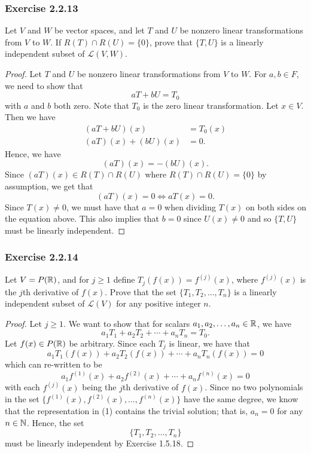 \subsubsection{Exercise 2.2.13} Let \( V  \) and \( W  \) be vector spaces, and let \( T  \) and \( U  \) be nonzero linear transformations from \( V  \) to \( W  \). If \( R(T) \cap R(U) = \{ 0  \}   \), prove that \( \{ T, U  \}   \) is a linearly independent subset of \( \mathcal{L}(V, W ) \).
\begin{proof}
Let \( T \) and \( U  \) be nonzero linear transformations from \( V  \) to \( W  \). For \( a,b \in F  \), we need to show that 
\[  aT + bU = {T}_{0} \] with \( a  \) and \( b  \) both zero. Note that \( {T}_{0} \) is the zero linear transformation. Let \( x \in V  \). Then we have
\begin{align*}
    (aT + bU)(x) &= {T}_{0}(x)  \\
    (aT)(x) + (bU)(x) &= 0. 
\end{align*}
Hence, we have
\[  (aT)(x) = -(bU)(x).  \]
Since \( (aT)(x) \in R(T) \cap R(U) \) where \( R(T) \cap R(U) = \{ 0  \}   \) by assumption, we get that
\[  (aT)(x) = 0 \iff aT(x) = 0. \]
Since \( T(x) \neq 0  \), we must have that \( a = 0  \) when dividing \( T(x)  \) on both sides on the equation above. This also implies that \( b = 0  \) since \( U(x) \neq 0  \) and so \( \{ T, U  \}  \) must be linearly independent.
\end{proof}

\subsubsection{Exercise 2.2.14} Let \( V = P(\mathbb{R}) \), and for \( j \geq 1   \) define \( {T}_{j}(f(x)) = f^{(j)}(x)  \), where \( f^{(j)}(x) \) is the \( j \)th derivative of \( f(x) \). Prove that the set \( \{ {T}_{1}, {T}_{2}, \dots, {T}_{n} \}  \) is a linearly independent subset of \( \mathcal{L}(V) \) for any positive integer \( n \).
\begin{proof}
Let \( j \geq 1  \). We want to show that for scalars \( {a}_{1}, {a}_{2}, \dots, {a}_{n} \in \mathbb{R}  \), we have
\[  {a}_{1} {T}_{1} + {a}_{2} {T}_{2} + \cdots + {a}_{n} {T}_{n} = {T}_{0}. \]
Let \( f(x) \in P(\mathbb{R}) \) be arbitrary. Since each \( {T}_{j} \) is linear, we have that
\[  {a}_{1} {T}_{1}(f(x)) + {a}_{2} {T}_{2}(f(x)) + \cdots + {a}_{n} {T}_{n}(f(x)) = 0 \]
which can re-written to be
\[  {a}_{1} f^{(1)}(x) + {a}_{2} f^{(2)}(x) + \cdots + {a}_{n} f^{(n)}(x) = 0 \tag{1} \]
with each \( f^{(j)}(x) \) being the \( j \)th derivative of \( f(x) \). Since no two polynomials in the set \( \{ f^{(1)}(x), f^{(2)}(x), \dots, f^{(n)}(x) \}  \) have the same degree, we know that the representation in (1) contains the trivial solution; that is, \( {a}_{n} = 0  \) for any \( n \in \mathbb{N}   \). Hence, the set \[  \{ {T}_{1}, {T}_{2}, \dots, {T}_{n} \}  \] must be linearly independent by Exercise 1.5.18.
\end{proof}

